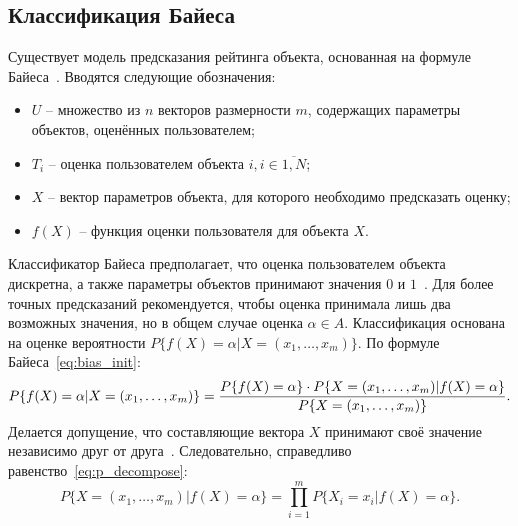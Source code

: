 \subsection{Классификация Байеса}
Существует модель предсказания рейтинга объекта, основанная на формуле Байеса~\cite{aggarwal}.
Вводятся следующие обозначения:
\begin{itemize}
    \item $U$ -- множество из $n$ векторов размерности $m$, содержащих параметры объектов, оценённых пользователем;
    \item $T_i$ -- оценка пользователем объекта $i, i \in \overline{1,N}$;
    \item $X$ -- вектор параметров объекта, для которого необходимо предсказать оценку;
    \item $f(X)$ -- функция оценки пользователя для объекта $X$.
\end{itemize}
Классификатор Байеса предполагает, что оценка пользователем объекта дискретна, а также параметры объектов принимают значения $0$ и $1$~\cite{aggarwal}.
Для более точных предсказаний рекомендуется, чтобы оценка принимала лишь два возможных значения, но в общем случае оценка $\alpha \in A$.
Классификация основана на оценке вероятности $P\{f(X) = \alpha | X = (x_1,\dots,x_m)\}$.
По формуле Байеса~\eqref{eq:bias_init}:
\begin{equation}
    \label{eq:bias_init}
    \small P\{f(X) = \alpha | X = (x_1,\dots,x_m)\} = \frac{P\{f(X)=\alpha\} \cdot P\{X=(x_1,\dots,x_m)|f(X)=\alpha\}}{P\{X=(x_1,\dots,x_m)\}}.
\end{equation}
Делается допущение, что составляющие вектора $X$ принимают своё значение независимо друг от друга~\cite{aggarwal}.
Следовательно, справедливо равенство~\eqref{eq:p_decompose}:
\begin{equation}
    \label{eq:p_decompose}
    P\{X=(x_1,\dots,x_m)|f(X)=\alpha\}=\prod_{i=1}^{m}{P\{X_i = x_i|f(X)=\alpha\}}.
\end{equation}

